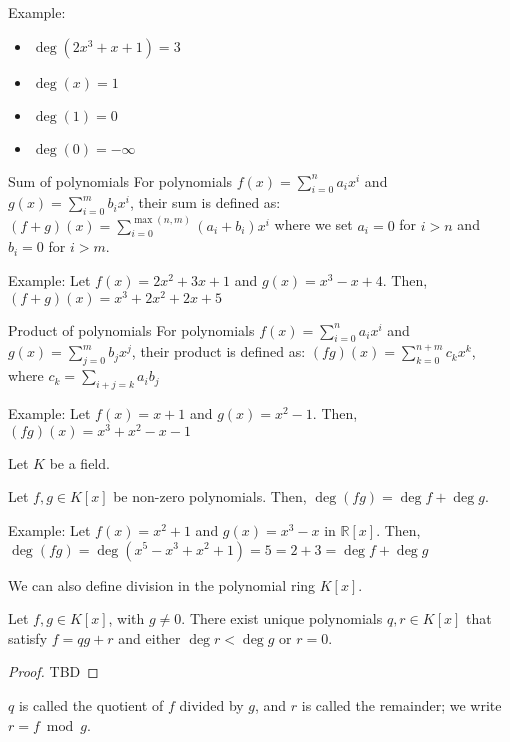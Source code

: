 \documentclass{article}
\begin{document}
Example: 

\begin{itemize}
    \item $\deg(2x^3 + x + 1) = 3$
    \item $\deg(x) = 1$
    \item $\deg(1) = 0$
    \item $\deg(0) = -\infty$
\end{itemize}


\begin{definition}{Sum of polynomials}{}
    For polynomials $f(x) = \sum_{i=0}^n a_i x^i$ and $g(x) = \sum_{i=0}^m b_i x^i$, their sum is defined as:
    $(f + g)(x) = \sum_{i=0}^{\max(n,m)} (a_i + b_i) x^i$
    where we set $a_i = 0$ for $i > n$ and $b_i = 0$ for $i > m$.
\end{definition}

Example: Let $f(x) = 2x^2 + 3x + 1$ and $g(x) = x^3 - x + 4$. Then, $(f + g)(x) = x^3 + 2x^2 + 2x + 5$

\begin{definition}{Product of polynomials}{}
    For polynomials $f(x) = \sum_{i=0}^n a_i x^i$ and $g(x) = \sum_{j=0}^m b_j x^j$, their product is defined as:
    $(fg)(x) = \sum_{k=0}^{n+m} c_k x^k$, where $c_k = \sum_{i+j=k} a_i b_j$
\end{definition}

Example: Let $f(x) = x + 1$ and $g(x) = x^2 - 1$. Then, $(fg)(x) = x^3 + x^2 - x - 1$

Let $K$ be a field.

\begin{lemma}{}{}
    Let $f, g \in K[x]$ be non-zero polynomials. Then, $\deg(fg) = \deg f + \deg g$.
\end{lemma}

Example: Let $f(x) = x^2 + 1$ and $g(x) = x^3 - x$ in $\mathbb{R}[x]$. Then, $\deg(fg) = \deg(x^5 - x^3 + x^2 + 1) = 5 = 2 + 3 = \deg f + \deg g$

We can also define division in the polynomial ring $K[x]$.

\begin{theorem}{}{}
    Let $f, g \in K[x]$, with $g \neq 0$. There exist unique polynomials $q, r \in K[x]$ that satisfy $f = qg + r$ and either $\deg r < \deg g$ or $r = 0$.
\end{theorem}

\begin{proof}
    TBD
\end{proof}

$q$ is called the quotient of $f$ divided by $g$, and $r$ is called the remainder; we write $r = f \bmod g$.
\end{document}
